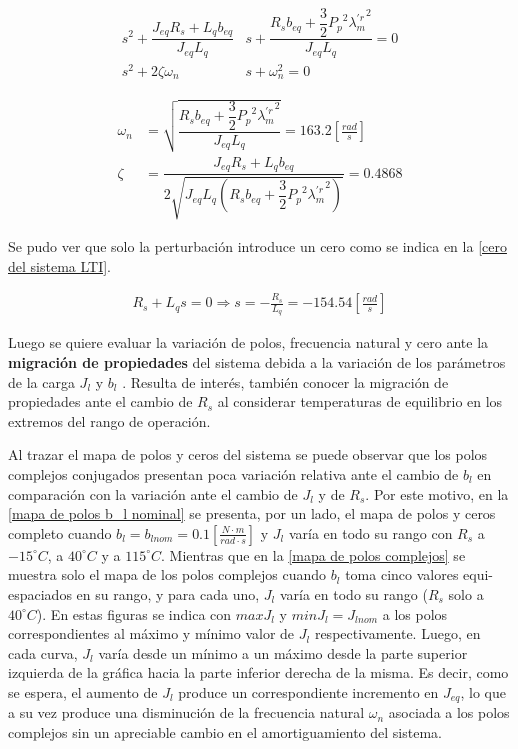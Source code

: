 \documentclass[a4paper, 10pt, onecolumn,journal]{ieeeconf}
\begin{document}
\begin{align}
	s^2 +\dfrac{ J_{eq} R_{s} + L_{q} b_{eq}}{J_{eq} L_{q}} &s +\dfrac{ R_{s} b_{eq} + \dfrac{3}{2} {P_{p}}^2 { \lambda^{'r}_m}^2}{J_{eq} L_{q}}  = 0 \label{polinomio caracteristico del sistema LTI polos complejos conjugados}\\
	s^2 + 2 \zeta \omega_{n} &s + \omega_{n}^{2} = 0 \label{ecuación estandar de un sistema de segundo orden}
\end{align}

\begin{align}
	\omega_{n} &= \sqrt{\dfrac{ R_{s} b_{eq} + \dfrac{3}{2} {P_{p}}^2 { \lambda^{'r}_m}^2}{J_{eq} L_{q}}} = 163.2 \left[\frac{rad}{s}\right] \label{ecuacion de las frecuencias naturales del LTI}\\
	\zeta &= \dfrac{ J_{eq} R_{s} + L_{q} b_{eq}}{2 \sqrt{ J_{eq} L_{q}\left( R_{s} b_{eq} + \dfrac{3}{2} {P_{p}}^2 { \lambda^{'r}_m}^2\right) }} = 0.4868 \label{ecuacion de las relaciones de amortiguamiento del LTI}
\end{align}

Se pudo ver que solo la perturbación introduce un cero como se indica en la \cref{cero del sistema LTI}.

\begin{align}
	R_{s} + L_{q} s = 0 \Rightarrow s = -\frac{R_{s}}{L_{q}} = -154.54 \left[\frac{rad}{s}\right]
	\label{cero del sistema LTI}
\end{align}


Luego se quiere evaluar la variación de  polos, frecuencia natural y  cero ante la 
\textbf{migración de propiedades} del sistema debida a la variación de los parámetros de la carga
$J_l$ y $b_l$ \cite{c1}. Resulta de interés, también conocer la migración
de propiedades ante el cambio de $R_s$ al considerar temperaturas de equilibrio en los extremos del rango de operación.

Al trazar el mapa de polos y ceros del sistema se puede observar que
los polos complejos conjugados presentan poca variación relativa ante el cambio de $b_l$ en comparación con la variación ante el cambio de $J_l$ y de $R_s$.
Por este motivo, en la \cref{mapa de polos b_l nominal} se presenta, por un lado, el mapa de polos y ceros completo cuando
$b_l = b_{lnom} = 0.1 \left[\frac{N \cdot m}{rad \cdot s}\right]$ y $J_l$ varía en todo su rango con $R_s$ a $-15^\circ C$, a $40^\circ C$ y a $115^\circ C$. Mientras que en la
\cref{mapa de polos complejos} se muestra solo el mapa de los polos complejos cuando
$b_l$ toma cinco valores equi-espaciados en su rango, y para cada uno, $J_l$ varía en todo su rango ($R_s$ solo a $40^\circ C$).
En estas figuras se indica con $max J_{l}$ y $min J_{l} = J_{lnom}$ a los polos correspondientes al máximo y mínimo valor
de $J_{l}$ respectivamente. Luego, en cada curva, $J_l$ varía desde un mínimo a un máximo
desde la parte superior izquierda de la gráfica hacia la parte inferior derecha de la misma. Es decir, como se espera, 
el aumento de $J_{l}$  produce un correspondiente incremento en $J_{eq}$,
lo que a su vez produce una disminución de la frecuencia natural $\omega_n$ asociada a los polos complejos sin un apreciable
cambio en el amortiguamiento del sistema.
\end{document}
